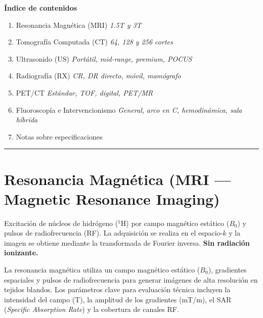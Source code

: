 \documentclass[11pt, a4paper]{article}
\begin{document}
\vspace{0.8cm}

\noindent\textbf{\color{navy}Índice de contenidos}

\vspace{0.3cm}
\begin{enumerate}[leftmargin=*, label=\textbf{\arabic*.}, itemsep=4pt]
  \item Resonancia Magnética (MRI) \dotfill \textit{1.5T y 3T}
  \item Tomografía Computada (CT) \dotfill \textit{64, 128 y 256 cortes}
  \item Ultrasonido (US) \dotfill \textit{Portátil, mid-range, premium, POCUS}
  \item Radiografía (RX) \dotfill \textit{CR, DR directo, móvil, mamógrafo}
  \item PET/CT \dotfill \textit{Estándar, TOF, digital, PET/MR}
  \item Fluoroscopía e Intervencionismo \dotfill \textit{General, arco en C, hemodinámica, sala híbrida}
  \item Notas sobre especificaciones \dotfill
\end{enumerate}

\vspace{0.5cm}
{\noindent\color{teal}\rule{\linewidth}{2pt}}

\newpage

\section{Resonancia Magnética (MRI --- Magnetic Resonance Imaging)}

\begin{principiobox}
Excitación de núcleos de hidrógeno ($^1$H) por campo magnético estático ($B_0$) y pulsos de
radiofrecuencia (RF). La adquisición se realiza en el espacio-$k$ y la imagen se obtiene
mediante la transformada de Fourier inversa. \textbf{Sin radiación ionizante.}
\end{principiobox}

\vspace{6pt}
La resonancia magnética utiliza un campo magnético estático ($B_0$), gradientes espaciales y
pulsos de radiofrecuencia para generar imágenes de alta resolución en tejidos blandos.
Los parámetros clave para evaluación técnica incluyen la intensidad del campo (T),
la amplitud de los gradientes (mT/m), el SAR (\textit{Specific Absorption Rate}) y la
cobertura de canales RF.
\end{document}
